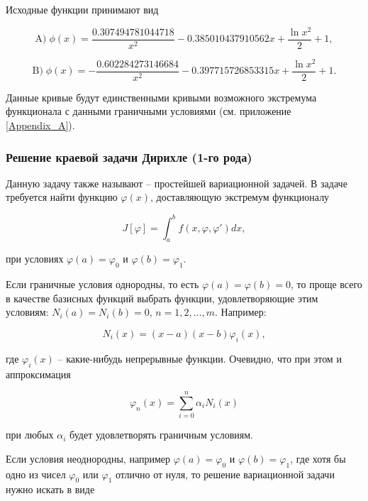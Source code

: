 \documentclass{article}
\begin{document}
\noindent Исходные функции принимают вид

\begin{equation}
	\text{A)} \; \phi(x) = \frac{0.307494781044718}{x^2} - 0.385010437910562 x + \frac{\ln{x^2}}{2} + 1,
\end{equation}

\begin{equation}
	\text{B)} \; \phi(x) = - \frac{0.602284273146684}{x^2} - 0.397715726853315 x + \frac{\ln{x^2}}{2} + 1.
\end{equation}

Данные кривые будут единственными кривыми возможного экстремума функционала с данными граничными условиями (см. приложение \ref{Appendix_A}). 

\subsubsection{Решение краевой задачи Дирихле (1-го рода)}

Данную задачу также называют – простейшей вариационной задачей. В задаче требуется найти функцию $\varphi(x)$, доставляющую экстремум функционалу

\begin{equation}
	J[\varphi] = \int_{a}^{b} f(x, \varphi, \varphi')dx,
\end{equation}

\noindent при условиях $\varphi(a) = \varphi_{0}$ и $\varphi(b) = \varphi_{1}$.

Если граничные условия однородны, то есть $\varphi(a) = \varphi(b) = 0$, то проще всего в качестве базисных функций выбрать функции, удовлетворяющие этим условиям: $N_{i}(a) = N_{i}(b) = 0$, $n = 1, 2, \ldots, m$. Например:

\begin{equation}
	N_{i}(x) = (x-a)(x-b)\varphi_{i}(x),
\end{equation}

\noindent где $\varphi_{i}(x)$ – какие-нибудь непрерывные функции. Очевидно, что при этом и аппроксимация 

\begin{equation}
	\varphi_{n}(x) = \sum_{i=0}^n \alpha_{i}N_{i}(x)
\end{equation}

\noindent при любых $\alpha_{i}$ будет удовлетворять граничным условиям.

Если условия неоднородны, например $\varphi(a) = \varphi_{0}$ и $\varphi(b) = \varphi_{1}$, где хотя бы одно из чисел $\varphi_{0}$ или $\varphi_{1}$ отлично от нуля, то решение вариационной задачи нужно искать в виде
\end{document}
